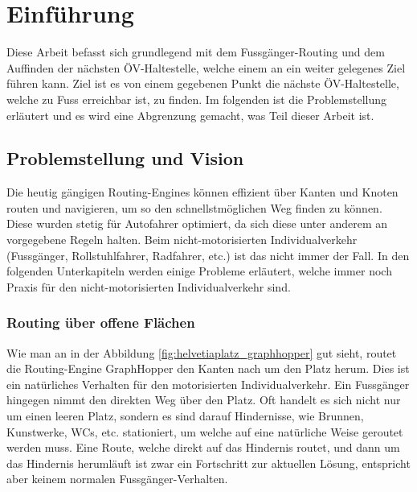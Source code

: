 \section{Einführung}
\label{sec:Einführung}
Diese Arbeit befasst sich grundlegend mit dem Fussgänger-Routing und dem Auffinden der nächsten ÖV-Haltestelle, welche einem an ein weiter gelegenes Ziel führen kann. Ziel ist es von einem gegebenen Punkt die nächste ÖV-Haltestelle, welche zu Fuss erreichbar ist, zu finden. Im folgenden ist die Problemstellung erläutert und es wird eine Abgrenzung gemacht, was Teil dieser Arbeit ist.

\subsection{Problemstellung und Vision}
\label{sub:Problemstellung und Vision}
Die heutig gängigen Routing-Engines können effizient über Kanten und Knoten routen und navigieren, um so den schnellstmöglichen Weg finden zu können. Diese wurden stetig für Autofahrer optimiert, da sich diese unter anderem an vorgegebene Regeln halten. Beim nicht-motorisierten Individualverkehr (Fussgänger, Rollstuhlfahrer, Radfahrer, etc.)  ist das nicht immer der Fall. In den folgenden Unterkapiteln werden einige Probleme erläutert, welche immer noch Praxis für den nicht-motorisierten Individualverkehr sind.

\subsubsection{Routing über offene Flächen}
\label{subsub:Routing über offene Flächen}
Wie man an in der Abbildung \ref{fig:helvetiaplatz_graphhopper} gut sieht, routet die Routing-Engine GraphHopper den Kanten nach um den Platz herum. Dies ist ein natürliches Verhalten für den motorisierten Individualverkehr. Ein Fussgänger hingegen nimmt den direkten Weg über den Platz. Oft handelt es sich nicht nur um einen leeren Platz, sondern es sind darauf Hindernisse, wie Brunnen, Kunstwerke, WCs, etc. stationiert, um welche auf eine natürliche Weise geroutet werden muss. Eine Route, welche direkt auf das Hindernis routet, und dann um das Hindernis herumläuft ist zwar ein Fortschritt zur aktuellen Lösung, entspricht aber keinem normalen Fussgänger-Verhalten. 

